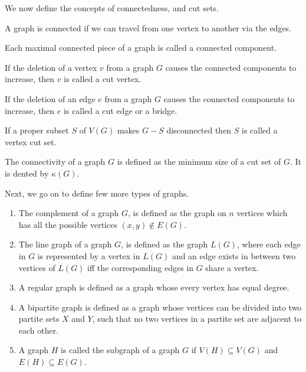 We now define the concepts of connectedness, and cut sets.\\
\begin{defn}
    A graph is connected if we can travel from one vertex to another via the edges.
\end{defn}

\begin{defn}
    Each maximal connected piece of a graph is called a connected component.
\end{defn}

\begin{defn}
    If the deletion of a vertex $v$ from a graph $G$ causes the connected components to increase, then $v$ is called a cut vertex. 
\end{defn}

\begin{defn}
    If the deletion of an edge $e$ from a graph $G$ causes the connected components to increase, then $e$ is called a cut edge or a bridge. 
\end{defn}

\begin{defn}
    If a proper subset $S$ of $V(G)$ makes $G-S$ disconnected then $S$ is called a vertex cut set.
\end{defn}

\begin{defn}
    The connectivity of a graph $G$ is defined as the minimum size of a cut set of $G$. It is dented by $\kappa(G)$.
\end{defn}

Next, we go on to define few more types of graphs.

\begin{enumerate}
    \item The complement of a graph $G$, is defined as the graph on $n$ vertices which has all the possible vertices $(x,y) \notin E(G)$.
    \item The line graph of a graph $G$, is defined as the graph $L(G)$, where each edge in $G$ is represented by a vertex in $L(G)$ and an edge exists in between two vertices of $L(G)$ iff the corresponding edges in $G$ share a vertex.
    \item A regular graph is defined as a graph whose every vertex has equal degree.
    \item A bipartite graph is defined as a graph whose vertices can be divided into two partite sets $X$ and $Y$, such that no two vertices in a partite set are adjacent to each other.
    \item A graph $H$ is called the subgraph of a graph $G$ if $V(H) \subseteq V(G)$ and $E(H) \subseteq E(G)$.
\end{enumerate}